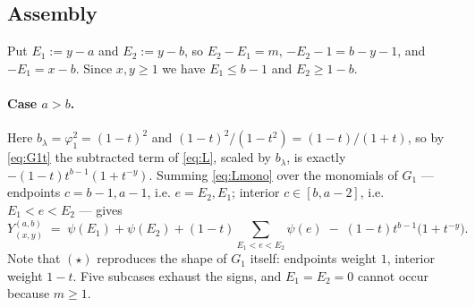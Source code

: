 \documentclass[11pt]{article}
\theoremstyle{definition}
\newcommand{\lam}{\lambda}
\begin{document}
\subsection{Assembly}

Put $E_1:=y-a$ and $E_2:=y-b$, so $E_2-E_1=m$, $-E_2-1=b-y-1$, and $-E_1=x-b$. Since
$x,y\ge1$ we have $E_1\le b-1$ and $E_2\ge 1-b$.

\paragraph{Case $a>b$.} Here $b_\lam=\varphi_1^2=(1-t)^2$ and
$(1-t)^2/(1-t^2)=(1-t)/(1+t)$, so by \eqref{eq:G1t} the subtracted term of \eqref{eq:L}, scaled by
$b_\lam$, is exactly $-(1-t)t^{b-1}(1+t^{-y})$. Summing \eqref{eq:Lmono} over the monomials of
$G_1$ --- endpoints $c=b-1,a-1$, i.e. $e=E_2,E_1$; interior $c\in[b,a-2]$, i.e.\ $E_1<e<E_2$ ---
gives
\begin{equation}\label{eq:star}
  Y^{(a,b)}_{(x,y)}
  \;=\;\psi(E_1)+\psi(E_2)+(1-t)\!\!\sum_{E_1<e<E_2}\!\!\psi(e)\;-\;(1-t)t^{b-1}\bigl(1+t^{-y}\bigr).
  \tag{$\star$}
\end{equation}
Note that $(\star)$ reproduces the shape of $G_1$ itself: endpoints weight $1$, interior weight
$1-t$. Five subcases exhaust the signs, and $E_1=E_2=0$ cannot occur because $m\ge1$.
\end{document}
